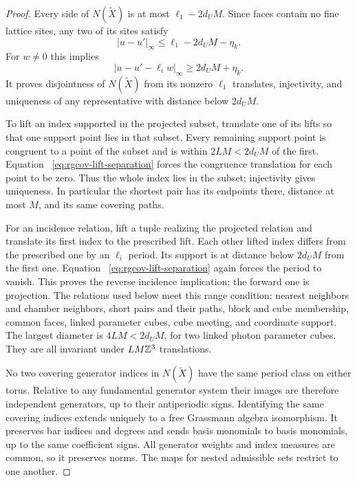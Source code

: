 \begin{proof}
Every side of $N(\widetilde X)$ is at most
$\ell_1-2d_UM$. Since faces contain no fine lattice
sites, any two of its sites satisfy
\[
 |u-u'|_\infty\le\ell_1-2d_UM-\eta_k.
\]
For $w\ne0$ this implies
\begin{equation}\label{eq:rgcov-lift-separation}
              |u-u'-\ell_iw|_\infty\ge2d_UM+\eta_k.
\end{equation}
It proves disjointness of $N(\widetilde X)$ from
its nonzero $\ell_1$ translates, injectivity, and
uniqueness of any representative with distance
below $2d_UM$.

To lift an index supported in the projected subset,
translate one of its lifts so that one support point
lies in that subset. Every remaining support point
is congruent to a point of the subset and is within
$2LM<2d_UM$ of the first. Equation~
\eqref{eq:rgcov-lift-separation} forces the congruence
translation for each point to be zero.
Thus the whole index lies in the subset; injectivity
gives uniqueness. In particular the shortest pair
has its endpoints there, distance at most $M$, and
its same covering paths.

For an incidence relation, lift a tuple realizing
the projected relation and translate its first index
to the prescribed lift. Each other lifted index
differs from the prescribed one by an $\ell_i$
period. Its support is at distance below $2d_UM$
from the first one. Equation~
\eqref{eq:rgcov-lift-separation} again forces the
period to vanish. This proves the reverse incidence
implication; the forward one is projection.
The relations used below meet this range condition:
nearest neighbors and chamber neighbors, short
pairs and their paths, block and cube membership,
common faces, linked parameter cubes, cube meeting,
and coordinate support. The largest diameter is
$4LM<2d_UM$, for two linked photon parameter cubes.
They are all invariant under $LM\mathbb Z^3$ translations.

No two covering generator indices in $N(\widetilde X)$
have the same period class on either torus.
Relative to any fundamental generator system their
images are therefore independent generators, up
to their antiperiodic signs.
Identifying the same covering indices extends
uniquely to a free Grassmann algebra isomorphism.
It preserves bar indices and degrees and sends
basis monomials to basis monomials, up to the
same coefficient signs. All generator weights and
index measures are common, so it preserves norms.
The maps for nested admissible sets restrict to
one another.
\end{proof}

